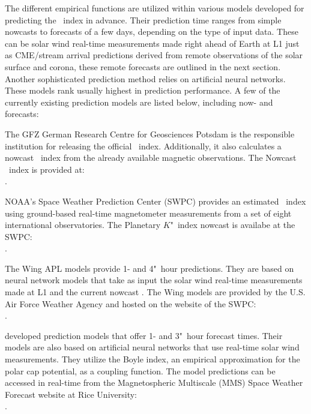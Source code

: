 The different empirical functions are utilized within various models developed for predicting the \Kp~index in advance. Their prediction time ranges from simple nowcasts to forecasts of a few days, depending on the type of input data. These can be solar wind real-time measurements made right ahead of Earth at L1 just as CME/stream arrival predictions derived from remote observations of the solar surface and corona, these remote forecasts are outlined in the next section.
Another sophisticated prediction method relies on artificial neural networks. These models rank usually highest in prediction performance.
A few of the currently existing \Kp{} prediction models are listed below, including now- and forecasts:
\begin{itemize*}
	\item The GFZ German Research Centre for Geosciences Potsdam is the responsible institution for releasing the official \Kp{}~index. Additionally, it also calculates a nowcast \Kp~index from the already available magnetic observations. The Nowcast \Kp~index is provided at:\\
	.
	
	\item NOAA's Space Weather Prediction Center (SWPC) provides an estimated \Kp~index using ground-based real-time magnetometer measurements from a set of eight international observatories. The Planetary $K$"~index nowcast is availabe at the SWPC:\\
	.
	
	\item The Wing APL models provide 1- and 4"~hour \Kp{} predictions. They are based on neural network models that take as input the solar wind real-time measurements made at L1 and the current \Kp{} nowcast \citep{Wing2005}. The Wing \Kp{} models are provided by the U.S. Air Force Weather Agency and hosted on the website of the SWPC:\\
	.
	
	\item \citet{Bala2012} developed \Kp{} prediction models that offer 1- and 3"~hour forecast times. Their models are also based on artificial neural networks that use real-time solar wind measurements. They utilize the Boyle index, an empirical approximation for the polar cap potential, as a coupling function. The model predictions can be accessed in real-time from the Magnetospheric Multiscale (MMS) Space Weather Forecast website at Rice University:\\
	.
	

\end{itemize*}
